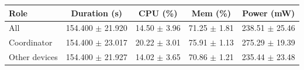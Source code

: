 \begin{tabular}{lcccc}
\hline
\textbf{Role} & \textbf{Duration (s)} & \textbf{CPU (\%)} & \textbf{Mem (\%)} & \textbf{Power (mW)} \\
\hline
All & 154.400 $\pm$ 21.920 & 14.50 $\pm$ 3.96 & 71.25 $\pm$ 1.81 & 238.51 $\pm$ 25.46 \\
Coordinator & 154.400 $\pm$ 23.017 & 20.22 $\pm$ 3.01 & 75.91 $\pm$ 1.13 & 275.29 $\pm$ 19.39 \\
Other devices & 154.400 $\pm$ 21.927 & 14.02 $\pm$ 3.65 & 70.86 $\pm$ 1.21 & 235.44 $\pm$ 23.48 \\
\hline
\end{tabular}
